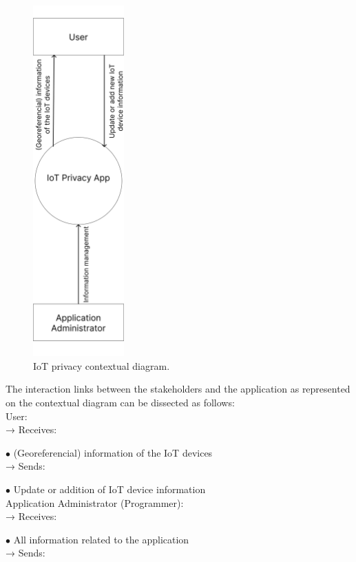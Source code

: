 \begin{figure}[H]
    \centering
    \includegraphics[width=3.5cm]{../app/docs/software_requirements/assets/images/contextual_diagram.png}
    \caption{IoT privacy contextual diagram.}
    \label{fig:contextual diagram}
\end{figure}

The interaction links between the stakeholders and the application as represented
on the contextual diagram can be dissected as follows:\\
\newline
User: \\
\newline
→ Receives:

$\bullet$ (Georeferencial) information of the IoT devices\\
\newline
→ Sends:

$\bullet$ Update or addition of IoT device information\\
\newline
Application Administrator (Programmer): \\
\newline
→ Receives:

$\bullet$ All information related to the application\\
\newline
→ Sends:

